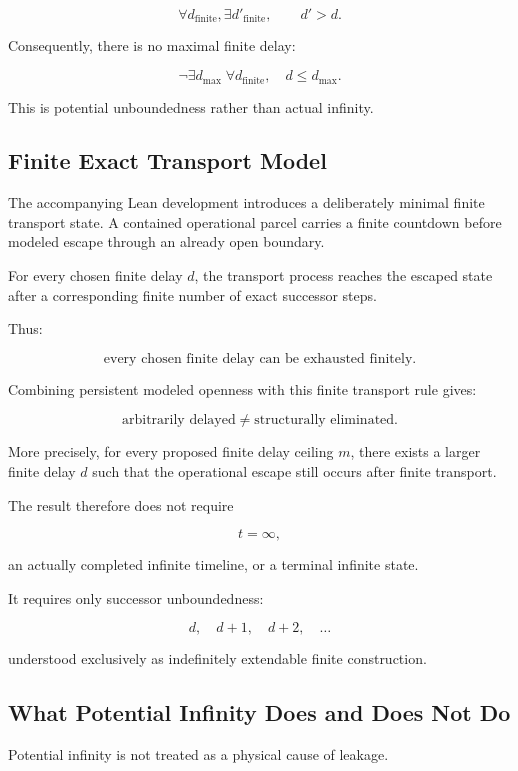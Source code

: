 \documentclass[11pt,a4paper]{article}
\begin{document}
\[
\forall d_{\mathrm{finite}},
\exists d'_{\mathrm{finite}},
\qquad
d'>d.
\]

Consequently, there is no maximal finite delay:

\[
\boxed{
\neg\exists d_{\max}
\;
\forall d_{\mathrm{finite}},
\quad
d\le d_{\max}.
}
\]

This is potential unboundedness rather than actual infinity.

\subsection{Finite Exact Transport Model}

The accompanying Lean development introduces a deliberately minimal
finite transport state. A contained operational parcel carries a
finite countdown before modeled escape through an already open
boundary.

For every chosen finite delay \(d\), the transport process reaches the
escaped state after a corresponding finite number of exact successor
steps.

Thus:

\[
\boxed{
\text{every chosen finite delay can be exhausted finitely}.
}
\]

Combining persistent modeled openness with this finite transport rule
gives:

\[
\boxed{
\text{arbitrarily delayed}
\neq
\text{structurally eliminated}.
}
\]

More precisely, for every proposed finite delay ceiling \(m\), there
exists a larger finite delay \(d\) such that the operational escape
still occurs after finite transport.

The result therefore does not require

\[
t=\infty,
\]

an actually completed infinite timeline, or a terminal infinite state.

It requires only successor unboundedness:

\[
d,\quad
d+1,\quad
d+2,\quad\ldots
\]

understood exclusively as indefinitely extendable finite
construction.

\subsection{What Potential Infinity Does and Does Not Do}

Potential infinity is not treated as a physical cause of leakage.
\end{document}
